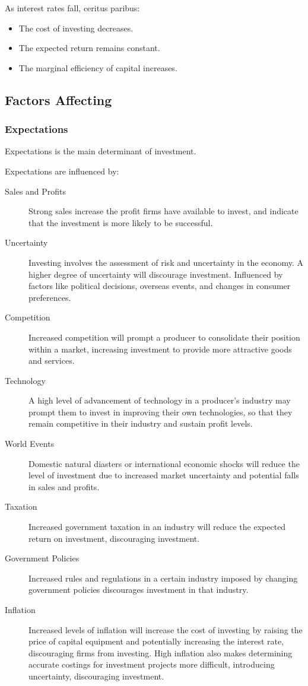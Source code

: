 \documentclass[a4paper,11pt]{report}
\begin{document}
As interest rates fall, ceritus paribus:

\begin{itemize}
\item The cost of investing decreases.
\item The expected return remains constant.
\item The marginal efficiency of capital increases.
\end{itemize}

\subsection{Factors Affecting}

\subsubsection{Expectations}

Expectations is the main determinant of investment.

Expectations are influenced by:

\begin{description}
\item [Sales and Profits] Strong sales increase the profit firms have available
	to invest, and indicate that the investment is more likely to be successful.
\item [Uncertainty] Investing involves the assessment of risk and uncertainty
	in the economy. A higher degree of uncertainty will discourage investment.
	Influenced by factors like political decisions, overseas events, and
	changes in consumer preferences.
\item [Competition] Increased competition will prompt a producer to consolidate
	their position within a market, increasing investment to provide more
	attractive goods and services.
\item [Technology] A high level of advancement of technology in a producer's
	industry may prompt them to invest in improving their own technologies, so
	that they remain competitive in their industry and sustain profit levels.
\item [World Events] Domestic natural diasters or international economic shocks
	will reduce the level of investment due to increased market uncertainty
	and potential falls in sales and profits.
\item [Taxation] Increased government taxation in an industry will reduce the
	expected return on investment, discouraging investment.
\item [Government Policies] Increased rules and regulations in a certain
	industry imposed by changing government policies discourages investment in
	that industry.
\item [Inflation] Increased levels of inflation will increase the cost of
	investing by raising the price of capital equipment and potentially
	increasing the interest rate, discouraging firms from investing. High
	inflation also makes determining accurate costings for investment projects
	more difficult, introducing uncertainty, discouraging investment.
\end{description}
\end{document}
